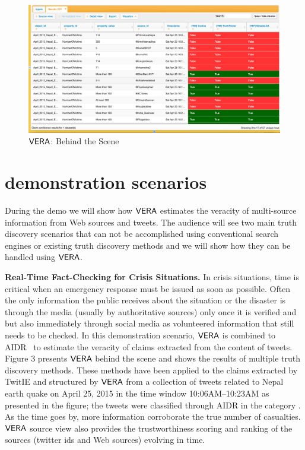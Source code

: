 \begin{figure}[t!]
 \begin{center}
  \includegraphics[width=.75\linewidth]{screenshot.png}
   \end{center}
\label{screenshot}\caption{$\mathsf{VERA}$: Behind the Scene}
\end{figure}

\section{demonstration scenarios}
During the demo we will show how $\mathsf{VERA}$  estimates the veracity
of multi-source information from  Web sources and tweets.
The audience will see two main truth discovery scenarios that can
not be accomplished using conventional search engines or existing
truth discovery methods and we will show how they can be handled
using $\mathsf{VERA}$.


\textbf{Real-Time Fact-Checking for Crisis Situations.}
In crisis situations, time is critical when  an emergency response must be issued as soon as possible. Often the only information the public receives about the situation or the disaster is through the media (usually by authoritative sources) only once it is verified and but also immediately through social media as volunteered information that still needs to be checked. In this demonstration scenario,  $\mathsf{VERA}$ is combined to AIDR~\cite{AIDR} to estimate the veracity of  claims extracted from the content of tweets. Figure 3 presents  $\mathsf{VERA}$ behind the scene and shows the results of multiple truth discovery methods. These methods have been applied to the claims extracted  by TwitIE and structured by $\mathsf{VERA}$ from a collection of tweets related to Nepal earth quake  on April 25, 2015 in the time window 10:06AM--10:23AM as presented in the figure; the tweets were classified through AIDR in the category . As the time goes by, more information corroborate the true number of casualties. $\mathsf{VERA}$ source view  also provides the trustworthiness scoring  and ranking of the sources (twitter ids and Web sources) evolving in time.


